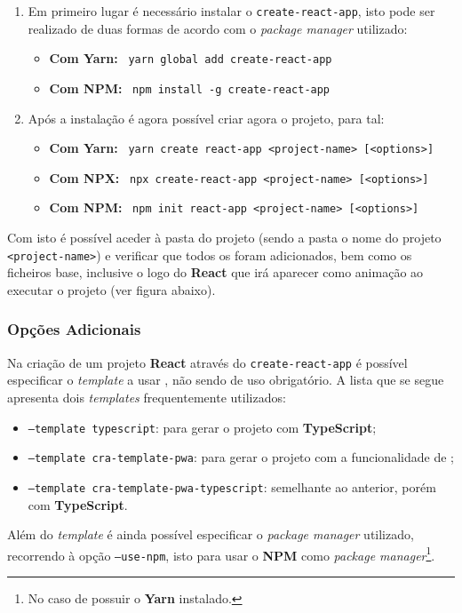 \begin{enumerate}
	\item Em primeiro lugar é necessário instalar o \texttt{create-react-app}, isto pode ser realizado de duas formas de acordo com o \textit{package manager} utilizado:
	\begin{itemize}
		\item \textbf{Com Yarn:} ~\texttt{yarn global add create-react-app}
		\item \textbf{Com NPM:} ~\texttt{npm install -g create-react-app}
	\end{itemize}
	\item Após a instalação é agora possível criar agora o projeto, para tal:
	\begin{itemize}
		\item \textbf{Com Yarn:} ~\texttt{yarn create react-app <project-name> [<options>]}
		\item \textbf{Com NPX:} ~\texttt{npx create-react-app <project-name> [<options>]}
		\item \textbf{Com NPM:} ~\texttt{npm init react-app <project-name> [<options>]}
	\end{itemize}
\end{enumerate}

Com isto é possível aceder à pasta do projeto (sendo a pasta o nome do projeto \textemdash~ \texttt{<project-name>}) e verificar que todos os \textit{\underline{}} foram adicionados, bem como os ficheiros base, inclusive o logo do \textbf{React} que irá aparecer como animação ao executar o projeto {\scriptsize (ver figura abaixo)}.


\subsubsection{Opções Adicionais}

Na criação de um projeto \textbf{React} através do \texttt{create-react-app} é possível especificar o \textit{template} a usar , não sendo de uso obrigatório. A lista que se segue apresenta dois \textit{templates} frequentemente utilizados:

\begin{itemize}
	\item \texttt{--template typescript}: para gerar o projeto com \textbf{TypeScript};
	\item \texttt{--template cra-template-pwa}: para gerar o projeto com a funcionalidade de ;
	\item \texttt{--template cra-template-pwa-typescript}: semelhante ao anterior, porém com \textbf{TypeScript}.
\end{itemize}

Além do \textit{template} é ainda possível especificar o \textit{package manager} utilizado, recorrendo à opção \texttt{--use-npm}, isto para usar o \textbf{NPM} como \textit{package manager}\footnote{No caso de possuir o \textbf{Yarn} instalado.}.